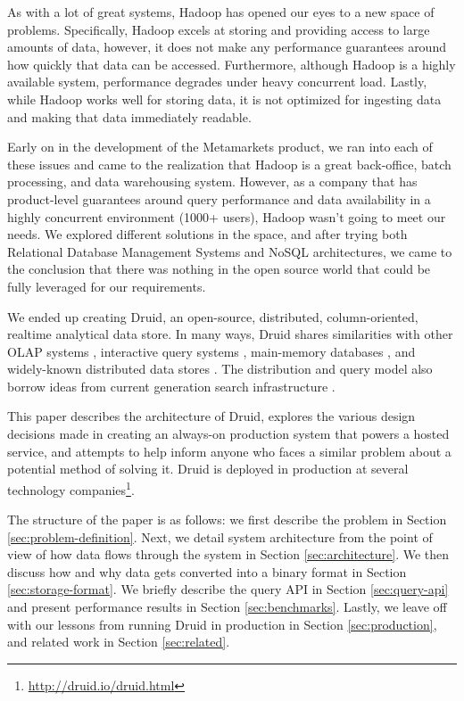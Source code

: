 \documentclass{acm_proc_article-sp}
\begin{document}
As with a lot of great systems, Hadoop has opened our eyes to a new space of
problems.  Specifically, Hadoop excels at storing and providing access to large
amounts of data, however, it does not make any performance guarantees around
how quickly that data can be accessed.  Furthermore, although Hadoop is a
highly available system, performance degrades under heavy concurrent load.
Lastly, while Hadoop works well for storing data, it is not optimized for
ingesting data and making that data immediately readable.

Early on in the development of the Metamarkets product, we ran into each of
these issues and came to the realization that Hadoop is a great back-office,
batch processing, and data warehousing system.  However, as a company that has
product-level guarantees around query performance and data availability in a
highly concurrent environment (1000+ users), Hadoop wasn't going to meet our
needs.  We explored different solutions in the space, and after
trying both Relational Database Management Systems and NoSQL architectures, we
came to the conclusion that there was nothing in the open source world that
could be fully leveraged for our requirements.

We ended up creating Druid, an open-source, distributed, column-oriented,
realtime analytical data store.  In many ways, Druid shares similarities with
other OLAP systems \cite{oehler2012ibm, schrader2009oracle, lachev2005applied},
interactive query systems \cite{melnik2010dremel}, main-memory databases
\cite{farber2012sap}, and widely-known distributed data stores
\cite{chang2008bigtable, decandia2007dynamo, lakshman2010cassandra}.  The
distribution and query model also borrow ideas from current generation search
infrastructure \cite{linkedin2013senseidb, apache2013solr,
banon2013elasticsearch}.

This paper describes the architecture of Druid, explores the various design
decisions made in creating an always-on production system that powers a hosted
service, and attempts to help inform anyone who faces a similar problem about a
potential method of solving it. Druid is deployed in production at several
technology
companies\footnote{\href{http://druid.io/druid.html}{http://druid.io/druid.html}}.

The structure of the paper is as follows: we first describe the problem in
Section \ref{sec:problem-definition}.  Next, we detail system architecture from
the point of view of how data flows through the system in Section
\ref{sec:architecture}.  We then discuss how and why data gets converted into a
binary format in Section \ref{sec:storage-format}.  We briefly describe the
query API in Section \ref{sec:query-api} and present performance results
in Section \ref{sec:benchmarks}. Lastly, we leave off with our lessons from
running Druid in production in Section \ref{sec:production}, and related work
in Section \ref{sec:related}.
\end{document}
